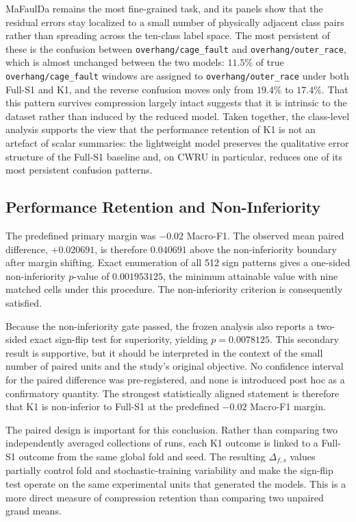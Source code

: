 MaFaulDa remains the most fine-grained task, and its panels show that the
residual errors stay localized to a small number of physically adjacent class
pairs rather than spreading across the ten-class label space. The most
persistent of these is the confusion between \texttt{overhang/cage\_fault} and
\texttt{overhang/outer\_race}, which is almost unchanged between the two models:
$11.5\%$ of true \texttt{overhang/cage\_fault} windows are assigned to
\texttt{overhang/outer\_race} under both Full-S1 and K1, and the reverse
confusion moves only from $19.4\%$ to $17.4\%$. That this pattern survives
compression largely intact suggests that it is intrinsic to the dataset rather
than induced by the reduced model. Taken together, the class-level analysis
supports the view that the performance retention of K1 is not an artefact of
scalar summaries: the lightweight model preserves the qualitative error
structure of the Full-S1 baseline and, on CWRU in particular, reduces one of its
most persistent confusion patterns.

\subsection{Performance Retention and Non-Inferiority}
\label{subsec:ni_results}

The predefined primary margin was $-0.02$ Macro-F1. The observed mean paired difference, $+0.020691$, is therefore $0.040691$ above the non-inferiority boundary after margin shifting. Exact enumeration of all 512 sign patterns gives a one-sided non-inferiority $p$-value of $0.001953125$, the minimum attainable value with nine matched cells under this procedure. The non-inferiority criterion is consequently satisfied.

Because the non-inferiority gate passed, the frozen analysis also reports a two-sided exact sign-flip test for superiority, yielding $p=0.0078125$. This secondary result is supportive, but it should be interpreted in the context of the small number of paired units and the study's original objective. No confidence interval for the paired difference was pre-registered, and none is introduced post hoc as a confirmatory quantity. The strongest statistically aligned statement is therefore that K1 is non-inferior to Full-S1 at the predefined $-0.02$ Macro-F1 margin.

The paired design is important for this conclusion. Rather than comparing two independently averaged collections of runs, each K1 outcome is linked to a Full-S1 outcome from the same global fold and seed. The resulting $\Delta_{f,s}$ values partially control fold and stochastic-training variability and make the sign-flip test operate on the same experimental units that generated the models. This is a more direct measure of compression retention than comparing two unpaired grand means.

